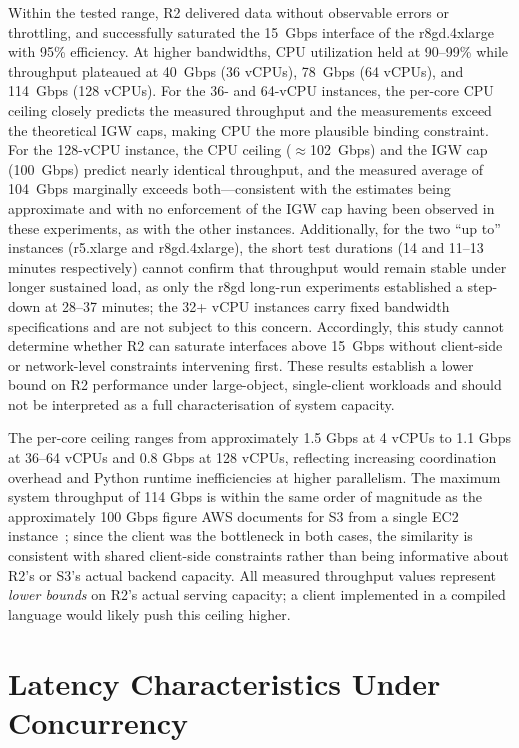 Within the tested range, R2 delivered data without observable errors or throttling, and successfully saturated the 15~Gbps interface of the r8gd.4xlarge with 95\% efficiency. At higher bandwidths, CPU utilization held at 90--99\% while throughput plateaued at 40~Gbps (36 vCPUs), 78~Gbps (64 vCPUs), and 114~Gbps (128 vCPUs). For the 36- and 64-vCPU instances, the per-core CPU ceiling closely predicts the measured throughput and the measurements exceed the theoretical IGW caps, making CPU the more plausible binding constraint. For the 128-vCPU instance, the CPU ceiling ($\approx$102~Gbps) and the IGW cap (100~Gbps) predict nearly identical throughput, and the measured average of 104~Gbps marginally exceeds both---consistent with the estimates being approximate and with no enforcement of the IGW cap having been observed in these experiments, as with the other instances. Additionally, for the two ``up to'' instances (r5.xlarge and r8gd.4xlarge), the short test durations (14 and 11--13 minutes respectively) cannot confirm that throughput would remain stable under longer sustained load, as only the r8gd long-run experiments established a step-down at 28--37 minutes; the 32+ vCPU instances carry fixed bandwidth specifications and are not subject to this concern. Accordingly, this study cannot determine whether R2 can saturate interfaces above 15~Gbps without client-side or network-level constraints intervening first. These results establish a lower bound on R2 performance under large-object, single-client workloads and should not be interpreted as a full characterisation of system capacity.

The per-core ceiling ranges from approximately 1.5 Gbps at 4 vCPUs to 1.1 Gbps at 36--64 vCPUs and 0.8 Gbps at 128 vCPUs, reflecting increasing coordination overhead and Python runtime inefficiencies at higher parallelism. The maximum system throughput of 114 Gbps is within the same order of magnitude as the approximately 100 Gbps figure AWS documents for S3 from a single EC2 instance~\cite{aws-s3-performance}; since the client was the bottleneck in both cases, the similarity is consistent with shared client-side constraints rather than being informative about R2's or S3's actual backend capacity. All measured throughput values represent \textit{lower bounds} on R2's actual serving capacity; a client implemented in a compiled language would likely push this ceiling higher.

\section{Latency Characteristics Under Concurrency}\label{sec:latency-analysis}


